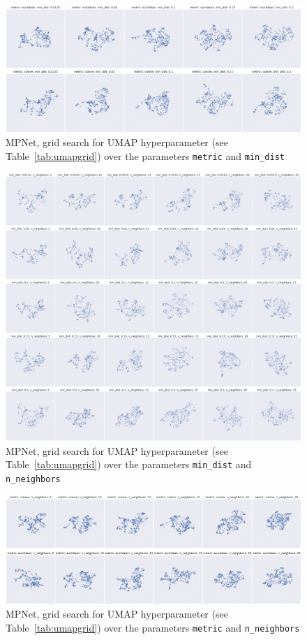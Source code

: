 \documentclass[10pt,oneside]{report}
\begin{document}
\begin{figure}[htbp]
    \centering
    \includegraphics[width=\textwidth]{./images/mpnethyp1.png}
    \caption{MPNet, grid search for UMAP hyperparameter (see Table~\ref{tab:umapgrid}) over the parameters \texttt{metric} and \texttt{min\_dist}}
    \label{fig:mpnet1}
\end{figure}%
\begin{figure}[htbp]
    \centering
    \includegraphics[width=\textwidth]{./images/mpnethyp2.png}
    \caption{MPNet, grid search for UMAP hyperparameter (see Table~\ref{tab:umapgrid}) over the parameters \texttt{min\_dist} and \texttt{n\_neighbors}}
    \label{fig:mpnet2}
\end{figure}%
\begin{figure}[htbp]
    \centering
    \includegraphics[width=\textwidth]{./images/mpnethyp3.png}
    \caption{MPNet, grid search for UMAP hyperparameter (see Table~\ref{tab:umapgrid}) over the parameters \texttt{metric} and \texttt{n\_neighbors}}
    \label{fig:mpnet3}
\end{figure}%
\end{document}
